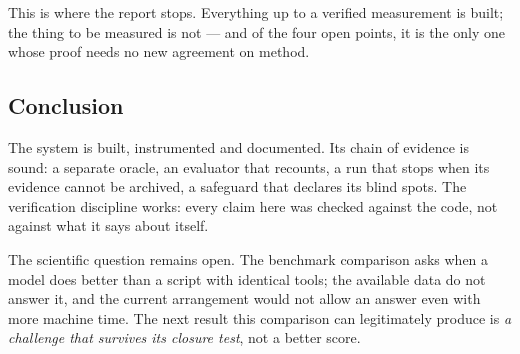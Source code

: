 

This is where the report stops. Everything up to a verified measurement is built;
the thing to be measured is not --- and of the four open points, it is the only one
whose proof needs no new agreement on method.

\begin{samepage}
\section{Conclusion}

The system is built, instrumented and documented. Its chain of evidence is sound:
a separate oracle, an evaluator that recounts, a run that stops when its evidence
cannot be archived, a safeguard that declares its blind spots. The verification discipline works: every claim here was checked against the code,
not against what it says about itself.

The scientific question remains open. The benchmark comparison asks when a model
does better than a script with identical tools; the available data do not answer
it, and the current arrangement would not allow an answer even with more machine
time. The next result this comparison can legitimately produce is \emph{a challenge
that survives its closure test}, not a better score.
\end{samepage}
